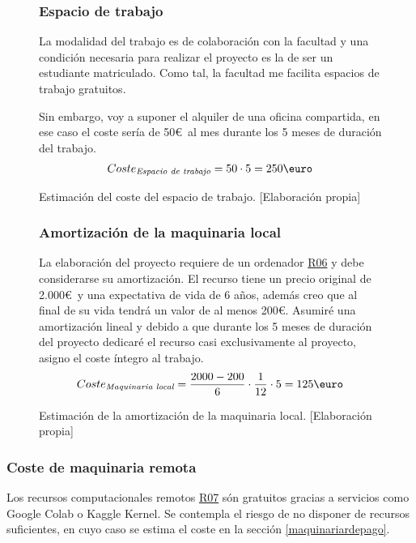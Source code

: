 \begin{figure}[ht]
    \subsubsection{Espacio de trabajo}
    La modalidad del trabajo es de colaboración con la facultad y una condición necesaria para realizar el proyecto
    es la de ser un estudiante matriculado. Como tal, la facultad me facilita espacios de trabajo gratuitos.
    
    Sin embargo, voy a suponer el alquiler de una oficina compartida, en ese caso el coste sería de 50\euro\
    al mes durante los 5 meses de duración del trabajo.
    \begin{align*}
        Coste_{\textit{Espacio de trabajo}} = 50 \cdot 5 = 250\text{\euro}
    \end{align*}
    \caption{Estimación del coste del espacio de trabajo.  [Elaboración propia]}
\end{figure}

\begin{figure}[H]
\subsubsection{Amortización de la maquinaria local}
La elaboración del proyecto requiere de un ordenador \hyperref[R06]{R06} y debe considerarse su 
amortización.
El recurso tiene un precio original de 2.000\euro\ y una expectativa de vida de 6 años, además creo que al final
de su vida tendrá un valor de al menos 200\euro. Asumiré una amortización lineal y debido a que durante los 5 meses
de duración del proyecto dedicaré el recurso casi exclusivamente al proyecto, asigno el coste íntegro al trabajo.
    \begin{align*}
        Coste_{\textit{Maquinaria local}} = \frac{2000-200}{6} \cdot \frac{1}{12} \cdot 5 = 125\text{\euro}
    \end{align*}
    \caption{Estimación de la amortización de la maquinaria local.  [Elaboración propia]}
\end{figure}

\subsubsection{Coste de maquinaria remota}
Los recursos computacionales remotos \hyperref[R07]{R07} són gratuitos gracias a servicios como
Google Colab o Kaggle Kernel.
Se contempla el riesgo de no disponer de recursos suficientes, en cuyo caso se estima el coste en
la sección \ref{maquinariardepago}.


